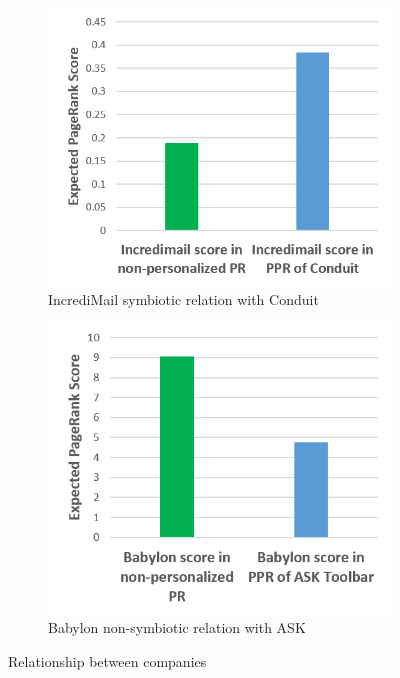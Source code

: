 \documentclass[ijoc,nonblindrev]{informs3} %
\numberwithin{equation}{subsection}
\begin{document}
\begin{figure}[!htbp]
\centering
\begin{subfigure}[b]{0.49\textwidth}
	\centering
\includegraphics[width=\textwidth]{figures/incredi_sym_conduit.png}
\caption{IncrediMail symbiotic relation with Conduit}
\label{fig:incredi_sym_conduit}
\end{subfigure}
\begin{subfigure}[b]{0.49\textwidth}
	\centering
\includegraphics[width=\textwidth]{figures/babylon_nosym_ask.png}
\caption{Babylon non-symbiotic relation with ASK}
\label{fig:babylon_nosym_ask}
\end{subfigure}
\caption{Relationship between companies}
	\label{fig:symbiotic_pagerank}
\end{figure}
\end{document}
